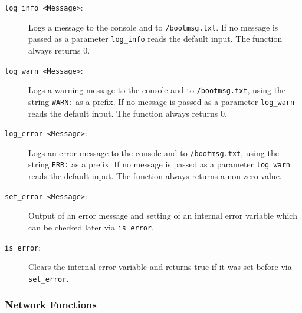 \begin{description}

\item[\texttt{log\_info <Message>}:] Logs a message to the console and to
\texttt{/bootmsg.txt}. If no message is passed as a parameter \texttt{log\_info}
reads the default input. The function always returns 0.

\item[\texttt{log\_warn <Message>}:] Logs a warning message to the console
and to \texttt{/bootmsg.txt}, using the string \texttt{WARN:} as a prefix. If no
message is passed as a parameter \texttt{log\_warn} reads the default input.
The function always returns 0.

\item[\texttt{log\_error <Message>}:] Logs an error message to the console
and to \texttt{/bootmsg.txt}, using the string \texttt{ERR:} as a prefix. If no
message is passed as a parameter \texttt{log\_warn} reads the default input.
The function always returns a non-zero value.

\item[\texttt{set\_error <Message>}:] Output of an error message and setting
of an internal error variable which can be checked later via \texttt{is\_error}.

\item[\texttt{is\_error}:] Clears the internal error variable and returns
true if it was set before via \texttt{set\_error}.

\end{description}

\subsubsection{Network Functions}

